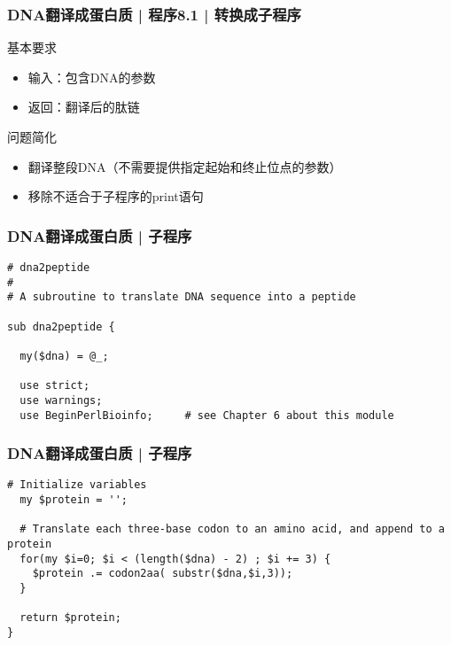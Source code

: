 \begin{frame}
  \frametitle{DNA翻译成蛋白质 | 程序8.1 | 转换成子程序}
  \begin{block}{基本要求}
  \begin{itemize}
    \item 输入：包含DNA的参数
    \item 返回：翻译后的肽链
  \end{itemize}
  \end{block}
  \pause
  \begin{block}{问题简化}
    \begin{itemize}
      \item 翻译整段DNA（不需要提供指定起始和终止位点的参数）
      \item 移除不适合于子程序的print语句
    \end{itemize}
  \end{block}
\end{frame}

\begin{frame}[fragile]
  \frametitle{DNA翻译成蛋白质 | \alert{子程序}}
\begin{lstlisting}[firstnumber=1]
# dna2peptide 
#
# A subroutine to translate DNA sequence into a peptide

sub dna2peptide {

  my($dna) = @_;

  use strict;
  use warnings;
  use BeginPerlBioinfo;     # see Chapter 6 about this module
\end{lstlisting}
\end{frame}

\begin{frame}[fragile]
  \frametitle{DNA翻译成蛋白质 | \alert{子程序}}
\begin{lstlisting}[firstnumber=13]
  # Initialize variables
  my $protein = '';

  # Translate each three-base codon to an amino acid, and append to a protein 
  for(my $i=0; $i < (length($dna) - 2) ; $i += 3) {
    $protein .= codon2aa( substr($dna,$i,3));
  }

  return $protein;
}
\end{lstlisting}
\end{frame}

